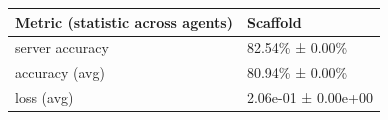 \begin{tabular}{ll}
\hline
 Metric (statistic across agents)   & Scaffold            \\
\hline
 server accuracy                    & 82.54\% ± 0.00\%      \\
 accuracy (avg)                     & 80.94\% ± 0.00\%      \\
 loss (avg)                         & 2.06e-01 ± 0.00e+00 \\
\hline
\end{tabular}